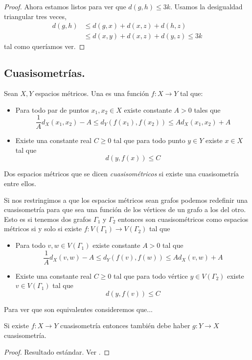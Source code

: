 \documentclass[tesis.tex]{subfiles}
\begin{document}
\begin{proof}
Ahora estamos listos para ver que $d(g,h) \le 3k$. Usamos la desigualdad triangular tres veces,
\begin{align*}
	d(g,h) & \le d(g,x) + d(x,z) + d(h,z) \\
	& \le d(x,y) + d(x,z) + d(y,z) \le 3k
\end{align*}
tal como queríamos ver.
\end{proof}


\subsection{Cuasisometrías.}


\begin{deff}
	Sean $X,Y$ espacios métricos. Una  es una función $f:X \to Y$ tal que:
	\begin{itemize}
	\item Para todo par de puntos $x_1,x_2 \in X$ existe constante $A > 0$ tales que
	\[
	\frac{1}{A} d_X(x_1,x_2) - A \le d_Y(f(x_1),f(x_2)) \le A d_X(x_1,x_2) + A
	\]
	\item Existe una constante real $C \ge 0$ tal que para todo punto $y \in Y$ existe $x \in X$ tal que 
	\[
	d(y,f(x)) \le C
	\]
	\end{itemize}
 	Dos espacios métricos que se dicen \emph{cuasisométricos} si existe una cuasisometría entre ellos.
\end{deff}

\begin{obs}
	Si nos restringimos a que los espacios métricos sean grafos podemos redefinir una cuasisometría para que sea una función de los vértices de un grafo a los del otro.
	Esto es si tenemos dos grafos $\Gamma_1$ y $\Gamma_2$ entonces son cuasisométricos como espacios métricos si y solo si existe $f:V(\Gamma_1) \to V(\Gamma_2)$ tal que 
	\begin{itemize}
		\item Para todo $v,w \in V(\Gamma_1)$ existe constante $A > 0$ tal que 
		\[
		\frac{1}{A} d_X(v,w) - A \le d_Y(f(v),f(w)) \le A d_X(v,w) + A
		\]
		\item Existe una constante real $C \ge 0$ tal que para todo vértice $y \in V(\Gamma_2)$ existe $v \in V(\Gamma_1)$ tal que 
		\[
		d(y,f(v)) \le C
		\]
	\end{itemize}
	
	Para ver que son equivalentes consideremos que...
\end{obs}

\begin{prop}
	Si existe $f:X \to Y$ cuasisometría entonces también debe haber $g:Y \to X$ cuasisometría.
\end{prop}
\begin{proof}
	Resultado estándar. Ver \cite{bridson2013metric}.
\end{proof}
\end{document}
